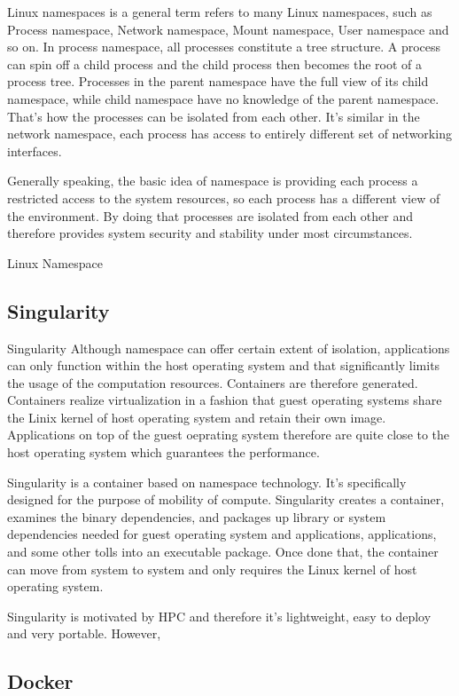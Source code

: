 \documentclass{article}
\begin{document}
	Linux namespaces is a general term refers to many Linux namespaces, such as Process namespace, Network namespace, Mount namespace, User namespace and so on. In process namespace, all processes constitute a tree structure. A process can spin off a child process and the child process then becomes the root of a process tree. Processes in the parent namespace have the full view of its child namespace, while child namespace have no knowledge of the parent namespace. That's how the processes can be isolated from each other. It's similar in the network namespace, each process has access to entirely different set of networking interfaces. 

	Generally speaking, the basic idea of namespace is providing each process a restricted access to the system resources, so each process has a different view of the environment. By doing that processes are isolated from each other and therefore provides system security and stability under most circumstances. 

Linux Namespace\cite{rosen2013resource}

\subsection{Singularity}

Singularity\cite{singularity} Although namespace can offer certain extent of isolation, applications can only function within the host operating system and that significantly limits the usage of the computation resources. Containers are therefore generated. Containers realize virtualization in a fashion that guest operating systems share the Linix kernel of host operating system and retain their own image. Applications on top of the guest oeprating system therefore are quite close to the host operating system which guarantees the performance. 

Singularity is a container based on namespace technology. It's specifically designed for the purpose of mobility of compute. Singularity creates a container, examines the binary dependencies, and packages up library or system dependencies needed for guest operating system and applications, applications, and some other tolls into an executable package. Once done that, the container can move from system to system and only requires the Linux kernel of host operating system.

Singularity is motivated by HPC and therefore it's lightweight, easy to deploy and very portable. However,  

\subsection{Docker}
\end{document}
